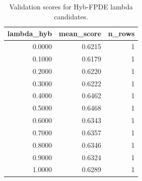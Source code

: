 \begin{table}[t]
\caption{Validation scores for Hyb-FPDE lambda candidates.}
\label{tab:lambda_distribution_computed}
\centering
\begin{tabular}{rrr}
\toprule
lambda\_hyb & mean\_score & n\_rows \\
\midrule
0.0000 & 0.6215 & 1 \\
0.1000 & 0.6179 & 1 \\
0.2000 & 0.6220 & 1 \\
0.3000 & 0.6222 & 1 \\
0.4000 & 0.6462 & 1 \\
0.5000 & 0.6468 & 1 \\
0.6000 & 0.6343 & 1 \\
0.7000 & 0.6357 & 1 \\
0.8000 & 0.6346 & 1 \\
0.9000 & 0.6324 & 1 \\
1.0000 & 0.6289 & 1 \\
\bottomrule
\end{tabular}

\end{table}
